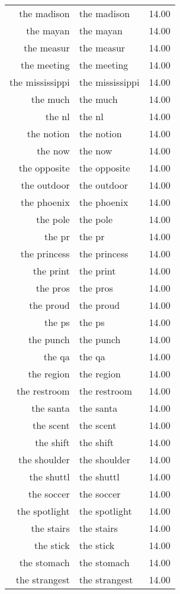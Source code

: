 \begin{table}[ht]
\begin{tabular}{rlr}
  the madison & the madison & 14.00 \\ 
  the mayan & the mayan & 14.00 \\ 
  the measur & the measur & 14.00 \\ 
  the meeting & the meeting & 14.00 \\ 
  the mississippi & the mississippi & 14.00 \\ 
  the much & the much & 14.00 \\ 
  the nl & the nl & 14.00 \\ 
  the notion & the notion & 14.00 \\ 
  the now & the now & 14.00 \\ 
  the opposite & the opposite & 14.00 \\ 
  the outdoor & the outdoor & 14.00 \\ 
  the phoenix & the phoenix & 14.00 \\ 
  the pole & the pole & 14.00 \\ 
  the pr & the pr & 14.00 \\ 
  the princess & the princess & 14.00 \\ 
  the print & the print & 14.00 \\ 
  the pros & the pros & 14.00 \\ 
  the proud & the proud & 14.00 \\ 
  the ps & the ps & 14.00 \\ 
  the punch & the punch & 14.00 \\ 
  the qa & the qa & 14.00 \\ 
  the region & the region & 14.00 \\ 
  the restroom & the restroom & 14.00 \\ 
  the santa & the santa & 14.00 \\ 
  the scent & the scent & 14.00 \\ 
  the shift & the shift & 14.00 \\ 
  the shoulder & the shoulder & 14.00 \\ 
  the shuttl & the shuttl & 14.00 \\ 
  the soccer & the soccer & 14.00 \\ 
  the spotlight & the spotlight & 14.00 \\ 
  the stairs & the stairs & 14.00 \\ 
  the stick & the stick & 14.00 \\ 
  the stomach & the stomach & 14.00 \\ 
  the strangest & the strangest & 14.00 \\ 

\end{tabular}
\end{table}
